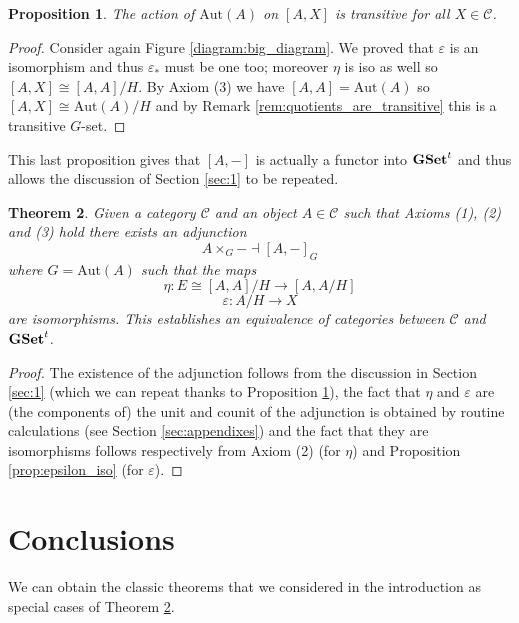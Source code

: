 \documentclass[italian, 12pt, reqno]{article}
\theoremstyle{myteo}
\newtheorem{theorem}{Theorem}[section]
\newtheorem{proposition}[theorem]{Proposition}
\numberwithin{equation}{section}
\newcommand{\cat}[1]{\mathscr{#1}}
\newcommand{\tgset}{\text{\textbf{GSet}}^t}
\newcommand{\homs}[2]{[#1, #2]}
\newcommand{\fun}[3]{#1\colon#2\to #3}
\begin{document}
\begin{proposition}
  \label{prop:transitive_action}
  The action of \(\text{Aut}(A)\) on \(\homs{A}{X}\) is transitive for all \(X\in\cat{C}\).
\end{proposition}

\begin{proof}
  Consider again Figure \ref{diagram:big_diagram}.
  We proved that \(\varepsilon\) is an isomorphism and thus \(\varepsilon_*\) must be one too; moreover \(\eta\) is iso as well so \([A, X] \cong [A, A]/H\).
  By Axiom (3) we have \([A, A] = \text{Aut}(A)\) so \([A, X] \cong \text{Aut}(A)/H\) and by Remark \ref{rem:quotients_are_transitive} this is a transitive \(G\)-set.
\end{proof}

This last proposition gives that \([A, -]\) is actually a functor into \(\tgset\) and thus allows the discussion of Section \ref{sec:1} to be repeated.

\begin{theorem}
  \label{theo:galois}
  Given a category \(\cat{C}\) and an object \(A\in\cat{C}\) such that Axioms (1), (2) and (3) hold there exists an adjunction
  \[A\times_G- \dashv \homs{A}{-}_G\]
  where \(G = \text{Aut}(A)\) such that the maps
  \[\fun{\eta}{E\cong \homs{A}{A}/H}{\homs{A}{A/H}}\]
  \[\fun{\varepsilon}{A/H}{X}\]
  are isomorphisms.
  This establishes an equivalence of categories between \(\cat{C}\) and \(\tgset\).
\end{theorem}

\begin{proof}
  The existence of the adjunction follows from the discussion in Section \ref{sec:1} (which we can repeat thanks to Proposition \ref{prop:transitive_action}), the fact that \(\eta\) and \(\varepsilon\) are (the components of) the unit and counit of the adjunction is obtained by routine calculations (see Section \ref{sec:appendixes}) and the fact that they are isomorphisms follows respectively from Axiom (2) (for \(\eta\)) and Proposition \ref{prop:epsilon_iso} (for \(\varepsilon\)).
\end{proof}

\section{Conclusions}
\label{sec:conclusions}
We can obtain the classic theorems that we considered in the introduction as special cases of Theorem \ref{theo:galois}.
\end{document}
